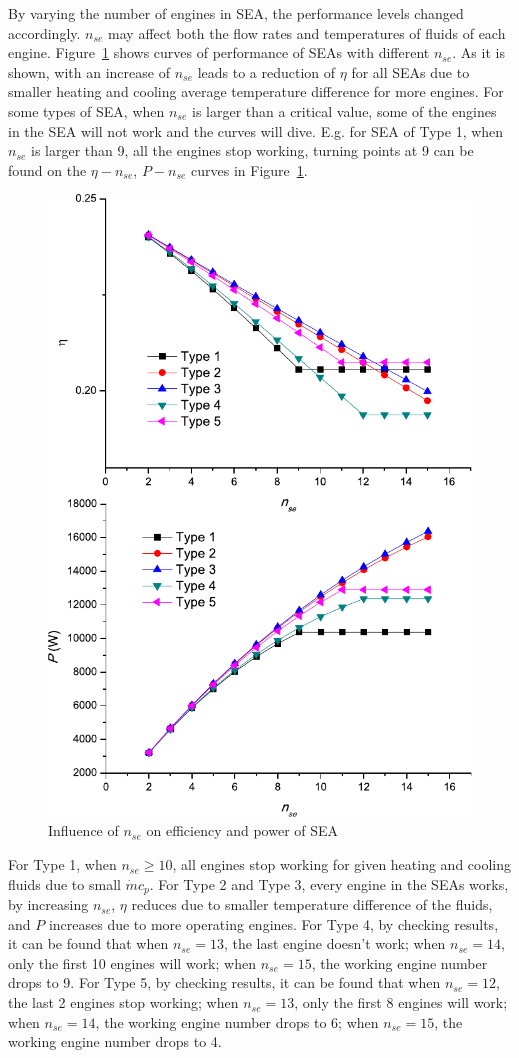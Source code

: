 By varying the number of engines in SEA, the performance levels changed accordingly. $n_{se}$ may affect both the flow rates and temperatures of fluids of each engine. Figure~\ref{fig:n_se} shows curves of performance of SEAs with different $n_{se}$. As it is shown, with an increase of $n_{se}$ leads to a reduction of $\eta$ for all SEAs due to smaller heating and cooling average temperature difference for more engines. For some types of SEA, when $n_{se}$ is larger than a critical value, some of the engines in the SEA will not work and the curves will dive. E.g. for SEA of Type 1, when $n_{se}$ is larger than 9, all the engines stop working, turning points at 9 can be found on the $\eta-n_{se}$, $P-n_{se}$ curves in Figure~\ref{fig:n_se}.

\noindent \begin{figure}[htbp]
\begin{center}
	\includegraphics[width = 0.7\columnwidth]{fig/n_se}
	\caption{Influence of $n_{se}$ on efficiency and power of SEA}
	\label{fig:n_se}
\end{center}
\end{figure}

For Type 1, when $n_{se} \geqslant 10$, all engines stop working for given heating and cooling fluids due to small $\dot{m}c_p$. For Type 2 and Type 3, every engine in the SEAs works, by increasing $n_{se}$, $\eta$ reduces due to smaller temperature difference of the fluids, and $P$ increases due to more operating engines. For Type 4, by checking results, it can be found that when $n_{se} = 13$,  the last engine doesn't work; when $n_{se} = 14$, only the first 10 engines will work; when $n_{se} = 15$, the working engine number drops to 9. For Type 5, by checking results, it can be found that when $n_{se} = 12$, the last 2 engines stop working; when $n_{se} = 13$, only the first 8 engines will work; when $n_{se} = 14$, the working engine number drops to 6; when $n_{se} = 15$, the working engine number drops to 4.

